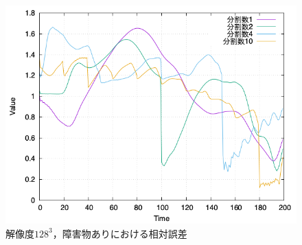 \documentclass[a4j,12pt]{jreport}
\begin{document}
\begin{figure}[htbp]
\centering
\includegraphics[width=140mm]{images/128error_obstacle.png}
\caption{$解像度128^3，障害物ありにおける相対誤差$}
\label{fig:128error_obstacle}
\end{figure}


\end{document}
